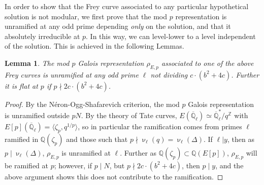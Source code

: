 \documentclass[12pt]{amsart}
\newtheorem{lem}[thm]{Lemma}
\theoremstyle{definition}
\def\Q{{\mathbb Q}}
\def\Z{{\mathbb Z}}
\renewcommand{\bar}{\overline}
\newcommand{\notdiv}{\nmid}
\begin{document}
In order to show that the Frey curve associated to any particular hypothetical solution is not modular, we first prove that the mod $p$ representation is unramified at any odd prime depending \emph{only} on the solution, and that it absolutely irreducible at $p$.  In this way, we can level-lower to a level independent of the solution.  This is achieved in the following Lemmas.


\begin{lem}\label{unram}
The mod $p$ Galois representation $\rho_{E,p}$ associated to one of the above Frey curves is unramified at any odd prime $\ell$ not dividing $c \cdot (b^2+4c)$.  Further it is flat at $p$ if $p \notdiv 2c\cdot (b^2+4c)$.
\end{lem}
\begin{proof}
By the N\'{e}ron-Ogg-Shafarevich criterion, the mod $p$ Galois representation is unramified outside $pN$.  By the theory of Tate curves, $E(\bar{\Q}_\ell) \simeq \bar{\Q}_\ell^\ast / q^{\Z}$ with $E[p](\bar{\Q}_\ell) = \langle \zeta_p, q^{1/p} \rangle$, so in particular the ramification comes from primes $\ell$ ramified in $\Q(\zeta_p)$ and those such that $p \notdiv \upnu_\ell(q) = \upnu_\ell(\Delta)$.  If $\ell | y$, then as $p \mid \upnu_\ell(\Delta)$, $\rho_{E,p}$ is unramified at $\ell$.  Further as $\Q(\zeta_p) \subset \Q(E[p])$, $\rho_{E,p}$ will be ramified at $p$; however, if $p \mid N$, but $p \notdiv 2c \cdot (b^2+4c)$, then $p \mid y$, and the above argument shows this does not contribute to the ramification.
\end{proof}
\end{document}
